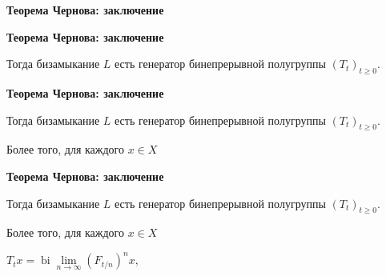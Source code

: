 \documentclass[11pt]{article}
\begin{document}
\newpage

\begin{center}
{\color{notaeYELLOW}\bfseries\fontsize{44}{52}\selectfont Теорема Чернова: заключение}
\end{center}
\vspace*{\fill}
\begin{center}
\fontsize{36}{43}\selectfont
\end{center}
\vspace*{\fill}

\newpage

\begin{center}
{\color{notaeYELLOW}\bfseries\fontsize{44}{52}\selectfont Теорема Чернова: заключение}
\end{center}
\vspace*{\fill}
\begin{center}
\fontsize{36}{43}\selectfont
\parbox{\linewidth}{\centering\noindent Тогда бизамыкание $L$ есть генератор бинепрерывной полугруппы $(T_t)_{t\ge0}$.
\par}\vspace{0.4in}
\end{center}
\vspace*{\fill}

\newpage

\begin{center}
{\color{notaeYELLOW}\bfseries\fontsize{44}{52}\selectfont Теорема Чернова: заключение}
\end{center}
\vspace*{\fill}
\begin{center}
\fontsize{36}{43}\selectfont
\parbox{\linewidth}{\centering\noindent Тогда бизамыкание $L$ есть генератор бинепрерывной полугруппы $(T_t)_{t\ge0}$.
\par}\vspace{0.4in}
\parbox{\linewidth}{\centering\noindent Более того, для каждого $x\in X$
\par}\vspace{0.4in}
\end{center}
\vspace*{\fill}

\newpage

\begin{center}
{\color{notaeYELLOW}\bfseries\fontsize{44}{52}\selectfont Теорема Чернова: заключение}
\end{center}
\vspace*{\fill}
\begin{center}
\fontsize{36}{43}\selectfont
\parbox{\linewidth}{\centering\noindent Тогда бизамыкание $L$ есть генератор бинепрерывной полугруппы $(T_t)_{t\ge0}$.
\par}\vspace{0.4in}
\parbox{\linewidth}{\centering\noindent Более того, для каждого $x\in X$
\par}\vspace{0.4in}
\parbox{\linewidth}{\centering\noindent $T_t x=\operatorname{bi}\lim\limits_{n\to\infty}(F_{t/n})^n x,$
\par}\vspace{0.4in}
\end{center}
\vspace*{\fill}
\end{document}

